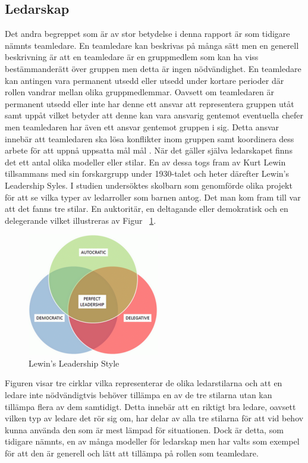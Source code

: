 \subsection{Ledarskap}
Det andra begreppet som är av stor betydelse i denna rapport är som tidigare nämnts teamledare. En teamledare kan beskrivas på många sätt men en generell beskrivning är att en teamledare är en gruppmedlem som kan ha viss bestämmanderätt över gruppen men detta är ingen nödvändighet. En teamledare kan antingen vara permanent utsedd eller utsedd under kortare perioder där rollen vandrar mellan olika gruppmedlemmar. Oavsett om teamledaren är permanent utsedd eller inte har denne ett ansvar att representera gruppen utåt samt uppåt vilket betyder att denne kan vara ansvarig gentemot eventuella chefer men teamledaren har även ett ansvar gentemot gruppen i sig. Detta ansvar innebär att teamledaren ska lösa konflikter inom gruppen samt koordinera dess arbete för att uppnå uppsatta mål mål \cite{BD}. 
\newline \newline
När det gäller själva ledarskapet finns det ett antal olika modeller eller stilar. En av dessa togs fram av Kurt Lewin tillsammans med sin forskargrupp under 1930-talet och heter därefter Lewin's Leadership Syles. I studien undersöktes skolbarn som genomförde olika projekt för att se vilka typer av ledarroller som barnen antog. Det man kom fram till var att det fanns tre stilar. En auktoritär, en deltagande eller demokratisk och en delegerande \cite{KAC} vilket illustreras av Figur ~\ref{fig:Lewin}. 
\begin{figure}[H]
\centerline{\includegraphics{adam-tex/graphic/leadership}}
\caption{Lewin's Leadership Style}
\label{fig:Lewin}
\end{figure}
\noindent Figuren visar tre cirklar vilka representerar de olika ledarstilarna och att en ledare inte nödvändigtvis behöver tillämpa en av de tre stilarna utan kan tillämpa flera av dem samtidigt. Detta innebär att en riktigt bra ledare, oavsett vilken typ av ledare det rör sig om, har delar av alla tre stilarna för att vid behov kunna använda den som är mest lämpad för situationen. Dock är detta, som tidigare nämnts, en av många modeller för ledarskap men har valts som exempel för att den är generell och lätt att tillämpa på rollen som teamledare.